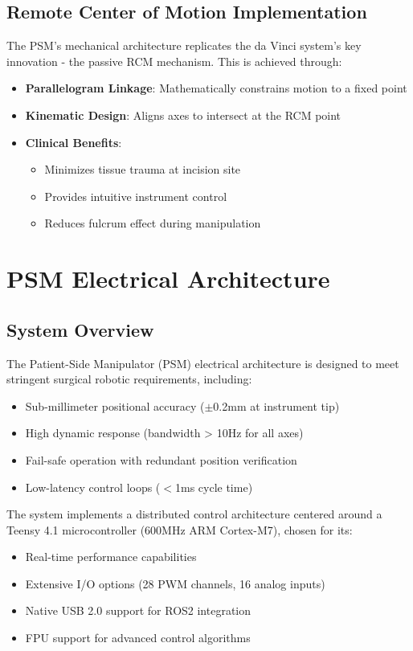 \subsection{Remote Center of Motion Implementation}
The PSM's mechanical architecture replicates the da Vinci system's key innovation - the passive RCM mechanism. This is achieved through:

\begin{itemize}
    \item \textbf{Parallelogram Linkage}: Mathematically constrains motion to a fixed point
    \item \textbf{Kinematic Design}: Aligns axes to intersect at the RCM point
    \item \textbf{Clinical Benefits}:
        \begin{itemize}
            \item Minimizes tissue trauma at incision site
            \item Provides intuitive instrument control
            \item Reduces fulcrum effect during manipulation
        \end{itemize}
\end{itemize}


\section{PSM Electrical Architecture}

\subsection{System Overview}
The Patient-Side Manipulator (PSM) electrical architecture is designed to meet stringent surgical robotic requirements, including:
\begin{itemize}
    \item Sub-millimeter positional accuracy ($\pm$0.2mm at instrument tip)
    \item High dynamic response (bandwidth > 10Hz for all axes)
    \item Fail-safe operation with redundant position verification
    \item Low-latency control loops ($<$1ms cycle time)
\end{itemize}

The system implements a distributed control architecture centered around a Teensy 4.1 microcontroller (600MHz ARM Cortex-M7), chosen for its:
\begin{itemize}
    \item Real-time performance capabilities
    \item Extensive I/O options (28 PWM channels, 16 analog inputs)
    \item Native USB 2.0 support for ROS2 integration
    \item FPU support for advanced control algorithms
\end{itemize}


